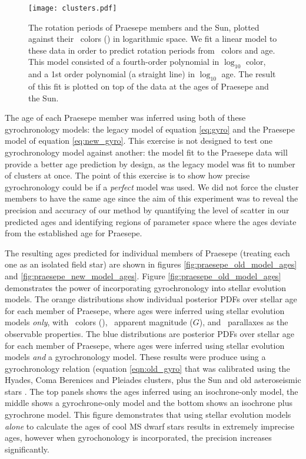 \begin{figure}
  \caption{
    The rotation periods of Praesepe members and the Sun, plotted against
    their \Gaia\ colors (\gcolor) in logarithmic space.
    We fit a linear model to these data in order to predict
    rotation periods from \gaia\ colors and age.
    This model consisted of a fourth-order polynomial in $\log_{10}$ color,
    and a 1st order polynomial (a straight line) in $\log_{10}$ age.
The result of this fit is plotted on top of the data at the ages of
    Praesepe and the Sun.
}
  \centering
    \texttt{[image: clusters.pdf]}
\label{fig:clusters}
\end{figure}

The age of each Praesepe member was inferred using both of these
gyrochronology models: the legacy model of equation \ref{eq:gyro} and the
Praesepe model of equation \ref{eq:new_gyro}.
This exercise is not designed to test one gyrochronology model against
another: the model fit to the Praesepe data will provide a better age
prediction by design, as the legacy model was fit to number of clusters at
once.
The point of this exercise is to show how precise gyrochronology could be if
a {\it perfect} model was used.
We did not force the cluster members to have the same age since the aim of
this experiment was to reveal the precision and accuracy of our method by
quantifying the level of scatter in our predicted ages and identifying regions
of parameter space where the ages deviate from the established age for
Praesepe.

The resulting ages predicted for individual members of Praesepe (treating each
one as an isolated field star) are shown in figures
\ref{fig:praesepe_old_model_ages} and \ref{fig:praesepe_new_model_ages}.
Figure \ref{fig:praesepe_old_model_ages} demonstrates the power of
incorporating gyrochronology into stellar evolution models.
The orange distributions show individual posterior PDFs over stellar age for
each member of Praesepe, where ages were inferred using stellar evolution
models {\it only}, with \gaia\ colors (\gcolor), \gaia\ apparent magnitude
($G$), and \gaia\ parallaxes as the observable properties.
The blue distributions are posterior PDFs over stellar age for each member of
Praesepe, where ages were inferred using stellar evolution models {\it and}
a gyrochronology model.
These results were produce using a gyrochronology relation (equation
\ref{eqn:old_gyro} that was calibrated using the Hyades, Coma Berenices and
Pleiades clusters, plus the Sun and old asteroseismic stars \citep{angus2015}.
The top panels shows the ages inferred using an isochrone-only model, the
middle shows a gyrochrone-only model and the bottom shows an isochrone plus
gyrochrone model.
This figure demonstrates that using stellar evolution models {\it alone} to
calculate the ages of cool MS dwarf stars results in extremely imprecise ages,
however when gyrochonology is incorporated, the precision increases
significantly.
